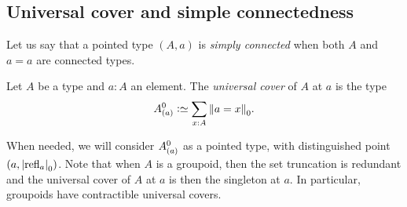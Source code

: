 \subsection{Universal cover and simple connectedness}
\label{sec:univ-cover-simple}

Let us say that a pointed type $(A,a)$ is {\em simply connected} when
both $A$ and $a=a$ are connected types.

\begin{definition}
  Let $A$ be a type and $a:A$ an element. The {\em universal cover} of
  $A$ at $a$ is the type
  \begin{displaymath}
    \univcover A a \defequi \sum_{x:A}\setTrunc{a=x}.
  \end{displaymath}
\end{definition}
When needed, we will consider ${{A}^0_{\left(a\right)}}$ as a pointed type, with
distinguished point $(a,{\lvert\mathrm{refl}_{a}\rvert}_0)$. Note that when $A$ is a
groupoid, then the set truncation is redundant and the universal cover
of $A$ at $a$ is then the singleton at $a$. In particular, groupoids
have contractible universal covers.

